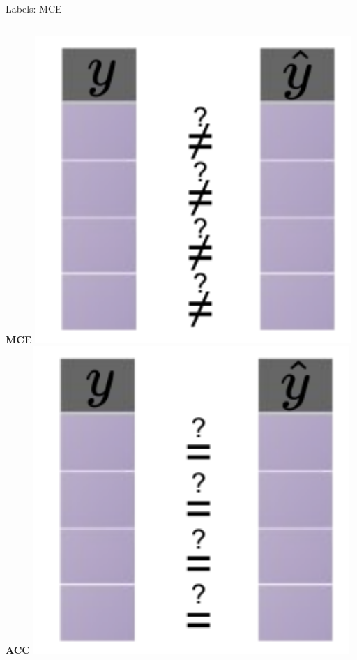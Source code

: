 \documentclass[11pt,compress,t,notes=noshow, xcolor=table]{beamer}
\begin{document}
\begin{vbframe}{Labels: MCE}
\begin{columns}
\begin{column}{0.29\textwidth}
\centering
\begin{center}
\textbf{MCE}
\includegraphics[width=0.9\textwidth]{figure_man/eval-classif-loss-compare-mce.pdf}
\textbf{ACC}
\includegraphics[width=0.9\textwidth]{figure_man/eval-classif-loss-compare.pdf}


\end{center}

\end{column}
\end{columns}



\end{vbframe}
\end{document}
